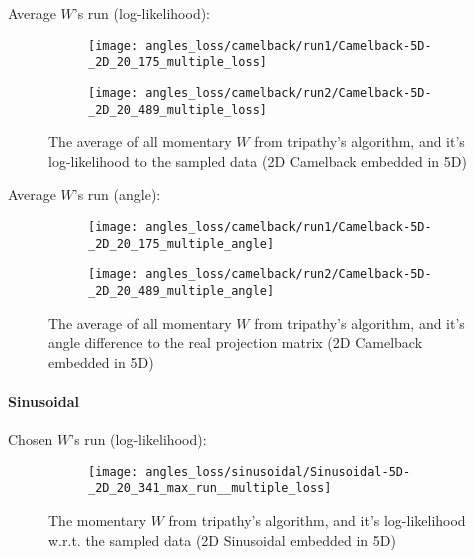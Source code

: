 Average $W$'s run (log-likelihood):
\begin{figure}[H]
    \centering
    \begin{subfigure}[b]{0.40\textwidth}
        \texttt{[image: angles\_loss/camelback/run1/Camelback-5D-\_2D\_20\_175\_multiple\_loss]}
        \label{fig:gull}
    \end{subfigure}
    \begin{subfigure}[b]{0.40\textwidth}
        \texttt{[image: angles\_loss/camelback/run2/Camelback-5D-\_2D\_20\_489\_multiple\_loss]}
        \label{fig:tiger}
    \end{subfigure}   
           \caption{The average of all momentary $W$ from tripathy's algorithm, and it's log-likelihood to the sampled data (2D Camelback embedded in 5D)}
\end{figure}

Average $W$'s run (angle):
\begin{figure}[H]
    \centering
    \begin{subfigure}[b]{0.40\textwidth}
        \texttt{[image: angles\_loss/camelback/run1/Camelback-5D-\_2D\_20\_175\_multiple\_angle]}
        \label{fig:gull}
    \end{subfigure}
    \begin{subfigure}[b]{0.40\textwidth}
        \texttt{[image: angles\_loss/camelback/run2/Camelback-5D-\_2D\_20\_489\_multiple\_angle]}
        \label{fig:tiger}
    \end{subfigure}   
           \caption{The average of all momentary $W$ from tripathy's algorithm, and it's angle difference to the real projection matrix (2D Camelback embedded in 5D)}
\end{figure}


\paragraph{Sinusoidal}
Chosen $W$'s run (log-likelihood):

\begin{figure}[H]
    \centering
    \begin{subfigure}[b]{0.40\textwidth}
        \texttt{[image: angles\_loss/sinusoidal/Sinusoidal-5D-\_2D\_20\_341\_max\_run\_\_multiple\_loss]}
        \label{fig:gull}
    \end{subfigure}
           \caption{The momentary $W$ from tripathy's algorithm, and it's log-likelihood w.r.t. the sampled data (2D Sinusoidal embedded in 5D)}
\end{figure}

